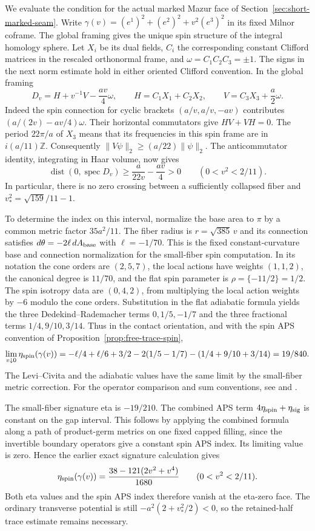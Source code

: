 We evaluate the condition for the actual marked Mazur face of
Section~\ref{sec:short-marked-seam}. Write
\(\gamma(v)=(e^1)^2+(e^2)^2+v^2(e^3)^2\) in its fixed Milnor
coframe. The global framing gives the unique spin structure of
the integral homology sphere. Let \(X_i\) be its dual fields,
\(C_i\) the corresponding constant Clifford matrices in the
rescaled orthonormal frame, and \(\omega=C_1C_2C_3=\pm1\).
The signs in the next norm estimate hold in either oriented
Clifford convention. In the global framing
\[
 D_v=H+v^{-1}V-\frac{av}{4}\omega,\qquad
 H=C_1X_1+C_2X_2,\qquad V=C_3X_3+\frac a2\omega .
\]
Indeed the spin connection for cyclic brackets
\((a/v,a/v,-av)\) contributes
\((a/(2v)-av/4)\omega\). Their horizontal commutators give
\(HV+VH=0\). The period \(22\pi/a\) of \(X_3\) means that its
frequencies in this spin frame are in \(i(a/11)\mathbb Z\).
Consequently \(\|V\psi\|_2\ge(a/22)\|\psi\|_2\).
The anticommutator identity, integrating in Haar volume, now
gives
\[
 \operatorname{dist}(0,\operatorname{spec}D_v)
  \ge\frac{a}{22v}-\frac{av}{4}>0
 \qquad(0<v^2<2/11).
\]
In particular, there is no zero crossing between a sufficiently
collapsed fiber and \(v_*^2=\sqrt{159}/11-1\).

To determine the index on this interval, normalize the base
area to \(\pi\) by a common metric factor \(35a^2/11\).
The fiber radius is \(r=\sqrt{385}\,v\) and its connection
satisfies \(d\theta=-2\ell\,dA_{\rm base}\) with
\(\ell=-1/70\). This is the fixed constant-curvature base
and connection normalization for the small-fiber spin
computation. In its notation the cone orders are \((2,5,7)\),
the local actions have weights \((1,1,2)\), the canonical
degree is \(11/70\), and the flat spin parameter is
\(\rho=\{-11/2\}=1/2\).
The spin isotropy data are \((0,4,2)\), from multiplying
the local action weights by \(-6\) modulo the cone orders.
Substitution in the flat adiabatic formula yields the three
Dedekind--Rademacher terms \(0,1/5,-1/7\) and the three
fractional terms \(1/4,9/10,3/14\). Thus in the contact
orientation, and with the spin APS convention of
Proposition~\ref{prop:free-trace-spin},
\[
 \lim_{v\downarrow0}\eta_{\rm spin}(\gamma(v))
 =-\ell/4+\ell/6+3/2-2(1/5-1/7)-(1/4+9/10+3/14)
 =19/840 .
\]
The Levi--Civita and the adiabatic values have the same limit
by the small-fiber metric correction.
For the operator comparison and sum conventions, see
\cite[\S1.2, (1.34)--(1.36), Remark~1.13]{Nicolaescu2000Seifert}
and \cite[\S1]{Nicolaescu2001Lattice}.

The small-fiber signature eta is \(-19/210\).
The combined APS term \(4\eta_{\rm spin}+\eta_{\rm sig}\)
is constant on the gap interval. This follows by applying
the combined formula along a path of product-germ metrics
on one fixed capped filling, since the invertible boundary
operators give a constant spin APS index. Its limiting value
is zero. Hence the earlier exact signature calculation gives
\[
 \eta_{\rm spin}(\gamma(v))=
     \frac{38-121(2v^2+v^4)}{1680}
 \qquad(0<v^2<2/11).
\]
Both eta values and the spin APS index therefore vanish at the
eta-zero face. The ordinary transverse potential is still
\(-a^2(2+v_*^2/2)<0\), so the retained-half trace estimate
remains necessary.

